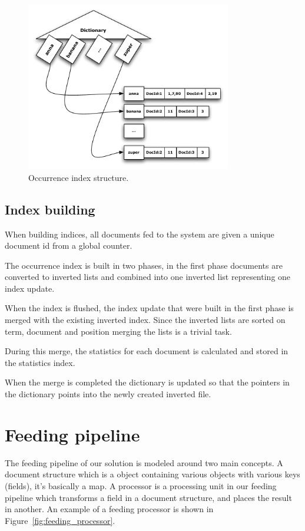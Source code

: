 \documentclass[]{article}
\begin{document}
\begin{figure}[h!!tb]
	\centering
	\includegraphics[width=0.8\textwidth]{index.pdf}
	\caption[Occurrence index structure]{Occurrence index structure.}\label{fig:occ_index_struct}
\end{figure}

\subsection{Index building}\label{sub:index_building}
When building indices, all documents fed to the system are given a unique document id from a global counter.

The occurrence index is built in two phases, in the first phase documents are converted to inverted lists and combined into one inverted list representing one index update. 

When the index is flushed, the index update that were built in the first phase is merged with the existing inverted index. Since the inverted lists are sorted on term, document and position merging the lists is a trivial task. 

During this merge, the statistics for each document is calculated and stored in the statistics index. 

When the merge is completed the dictionary is updated so that the pointers in the dictionary points into the newly created inverted file. 

\section{Feeding pipeline}\label{sec:feeding_pipeline}
The feeding pipeline of our solution is modeled around two main concepts. A document structure which is a object containing various objects with various keys (fields), it's basically a map. A processor is a processing unit in our feeding pipeline which transforms a field in a document structure, and places the result in another. An example of a feeding processor is shown in Figure~\ref{fig:feeding_processor}.
\end{document}
